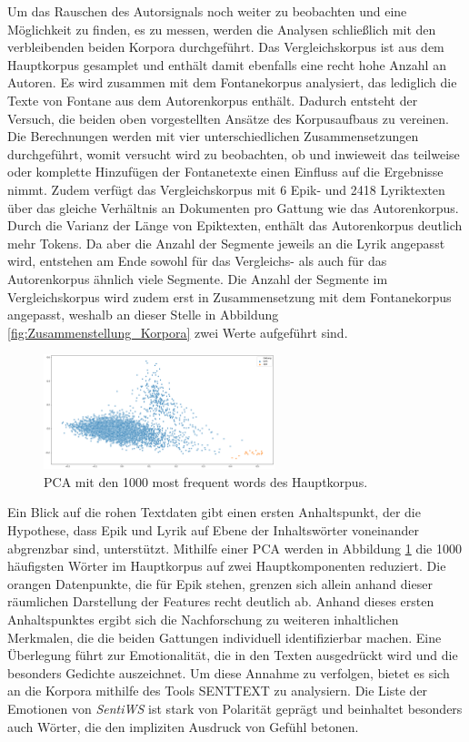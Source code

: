 \documentclass[a4paper,10p]{article}
\begin{document}
Um das Rauschen des Autorsignals noch weiter zu beobachten und eine Möglichkeit zu finden, es zu messen, werden die Analysen schließlich mit den verbleibenden beiden Korpora durchgeführt. Das Vergleichskorpus ist aus dem Hauptkorpus gesamplet und enthält damit ebenfalls eine recht hohe Anzahl an Autoren. Es wird zusammen mit dem Fontanekorpus analysiert, das lediglich die Texte von Fontane aus dem Autorenkorpus enthält. Dadurch entsteht der Versuch, die beiden oben vorgestellten Ansätze des Korpusaufbaus zu vereinen. Die Berechnungen werden mit vier unterschiedlichen Zusammensetzungen durchgeführt, womit versucht wird zu beobachten, ob und inwieweit das teilweise oder komplette Hinzufügen der Fontanetexte einen Einfluss auf die Ergebnisse nimmt. Zudem verfügt das Vergleichskorpus mit 6 Epik- und 2418 Lyriktexten über das gleiche Verhältnis an Dokumenten pro Gattung wie das Autorenkorpus. Durch die Varianz der Länge von Epiktexten, enthält das Autorenkorpus deutlich mehr Tokens. Da aber die Anzahl der Segmente jeweils an die Lyrik angepasst wird, entstehen am Ende sowohl für das Vergleichs- als auch für das Autorenkorpus ähnlich viele Segmente. Die Anzahl der Segmente im Vergleichskorpus wird zudem erst in Zusammensetzung mit dem Fontanekorpus angepasst, weshalb an dieser Stelle in Abbildung \ref{fig:Zusammenstellung_Korpora} zwei Werte aufgeführt sind. \par

\begin{figure}
	\includegraphics[width=0.6\textwidth]{pca_mfw.png}
	\caption{PCA mit den 1000 most frequent words des Hauptkorpus.}
	\label{fig:PCA_mfw}
\end{figure}

Ein Blick auf die rohen Textdaten gibt einen ersten Anhaltspunkt, der die Hypothese, dass Epik und Lyrik auf Ebene der Inhaltswörter voneinander abgrenzbar sind, unterstützt. Mithilfe einer PCA werden in Abbildung \ref{fig:PCA_mfw} die 1000 häufigsten Wörter im Hauptkorpus auf zwei Hauptkomponenten reduziert. Die orangen Datenpunkte, die für Epik stehen, grenzen sich allein anhand dieser räumlichen Darstellung der Features recht deutlich ab. Anhand dieses ersten Anhaltspunktes ergibt sich die Nachforschung zu weiteren inhaltlichen Merkmalen, die die beiden Gattungen individuell identifizierbar machen. Eine Überlegung führt zur Emotionalität, die in den Texten ausgedrückt wird und die besonders Gedichte auszeichnet. Um diese Annahme zu verfolgen, bietet es sich an die Korpora mithilfe des Tools SENTTEXT zu analysiern. Die Liste der Emotionen von \textit{SentiWS} \citep{Sentiws} ist stark von Polarität geprägt und beinhaltet besonders auch Wörter, die den impliziten Ausdruck von Gefühl betonen. \par 
\end{document}
